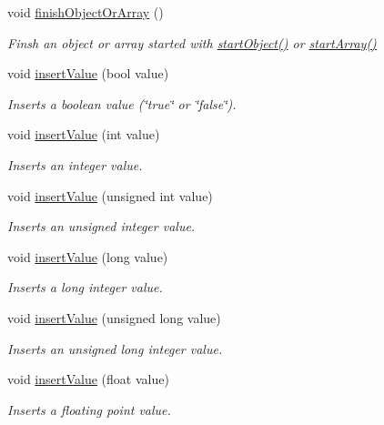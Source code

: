 \begin{DoxyCompactItemize}
void \hyperlink{class_json_writer_adbd96b46b0679bea3a066c0e62bd86b0}{finish\+Object\+Or\+Array} ()
\begin{DoxyCompactList}\small\item\em Finsh an object or array started with \hyperlink{class_json_writer_a43d1a78bf211a2f12cfe9253462717ae}{start\+Object()} or \hyperlink{class_json_writer_a7ccfcbf66a8ed9a2728e6f6ae4b705ec}{start\+Array()} \end{DoxyCompactList}\item 
void \hyperlink{class_json_writer_ac58734c238ba7be066838591b0cc7743}{insert\+Value} (bool value)
\begin{DoxyCompactList}\small\item\em Inserts a boolean value (\char`\"{}true\char`\"{} or \char`\"{}false\char`\"{}). \end{DoxyCompactList}\item 
void \hyperlink{class_json_writer_a69da120fb595f2820dd73f0c9339e093}{insert\+Value} (int value)
\begin{DoxyCompactList}\small\item\em Inserts an integer value. \end{DoxyCompactList}\item 
void \hyperlink{class_json_writer_a296c63529260115c9fa0aced54960903}{insert\+Value} (unsigned int value)
\begin{DoxyCompactList}\small\item\em Inserts an unsigned integer value. \end{DoxyCompactList}\item 
void \hyperlink{class_json_writer_a069e3c244a8a320eaa9dd5625874d98e}{insert\+Value} (long value)
\begin{DoxyCompactList}\small\item\em Inserts a long integer value. \end{DoxyCompactList}\item 
void \hyperlink{class_json_writer_a69d2d9ed9023105c3f84ce645919502b}{insert\+Value} (unsigned long value)
\begin{DoxyCompactList}\small\item\em Inserts an unsigned long integer value. \end{DoxyCompactList}\item 
void \hyperlink{class_json_writer_a5651b6c191da0397dab40c5ad51af1ec}{insert\+Value} (float value)
\begin{DoxyCompactList}\small\item\em Inserts a floating point value. \end{DoxyCompactList}\item 

\end{DoxyCompactItemize}
